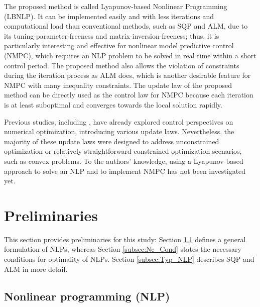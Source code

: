 \documentclass[journal]{IEEEtranTIE}
\newcommand{\KYCH}[1]{{\color{blue} [KC: #1]}} %
\begin{document}
The proposed method is called Lyapunov-based Nonlinear Programming (LBNLP). It can be implemented easily and with less iterations and computational load than conventional methods, such as SQP and ALM, due to its tuning-parameter-freeness and matrix-inversion-freeness; thus, it is particularly interesting and effective for nonlinear model predictive control (NMPC), which requires an NLP problem to be solved in real time within a short control period. The proposed method also allows the violation of constraints during the iteration process as ALM does, which is another desirable feature for NMPC with many inequality constraints. The update law of the proposed method can be directly used as the control law for NMPC because each iteration is at least suboptimal and converges towards the local solution rapidly. 

Previous studies, including \cite{bhaya2006control}, have already explored control perspectives on numerical optimization, introducing various update laws. Nevertheless, the majority of these update laws were designed to address unconstrained optimization or relatively straightforward constrained optimization scenarios, such as convex problems. To the authors' knowledge, using a Lyapunov-based approach to solve an NLP and to implement NMPC has not been investigated yet. %


\section{Preliminaries}
\label{sec:Preliminaries}
This section provides preliminaries for this study: Section \ref{subsec:NLP} defines a general formulation of NLPs, whereas Section \ref{subsec:Ne_Cond} states the necessary conditions for optimality of NLPs. Section \ref{subsec:Typ_NLP} describes SQP and ALM in more detail.

\subsection{Nonlinear programming (NLP)}\label{subsec:NLP}
\end{document}
